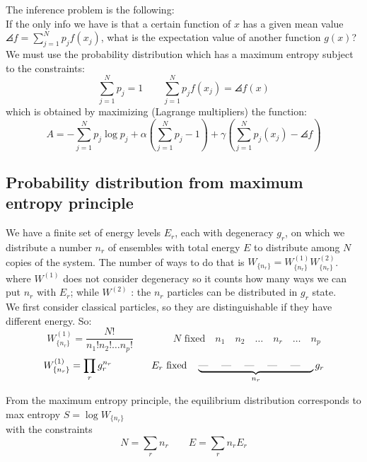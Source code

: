 The inference problem is the following:\\
If the only info we have is that a certain function of $x$ has a given mean value $\angles f = \sum_{j=1}^N p_j f(x_j)$, what is the expectation value of another function $g(x)$?
We must use the probability distribution which has a maximum entropy subject to the constraints:
$$ \sum_{j=1}^N p_j = 1 \qquad \sum_{j=1}^N p_jf(x_j) = \angles {f(x)}$$
which is obtained by maximizing (Lagrange multipliers) the function:
$$ A = -\sum_{j=1}^N p_j\log p_j + \alpha \left(\sum_{j=1}^N p_j - 1 \right) + \gamma \left(\sum_{j=1}^N p_j(x_j) - \angles f \right)$$


\subsection{Probability distribution from maximum entropy principle}
We have a finite set of energy levels $E_r$, each with degeneracy $g_r$, on which we distribute a number $n_r$ of ensembles with total energy $E$ to distribute among $N$ copies of the system.
The number of ways to do that is $W_{\{n_r\}} = W^{(1)}_{\{n_r\}} W^{(2)}_{\{n_r\}}$.\\
where $W^{(1)}$ does not consider degeneracy so it counts how many ways we can put $n_r$ with $E_r$; while $W^{(2)}$ : the $n_r$ particles can be distributed in $g_r$ state.\\

We first consider classical particles, so they are distinguishable if they have different energy. So:
$$ W^{(1)}_{\{n_r\}} = \frac{N!}{n_1!n_2!\dots n_p!} \qquad\qquad \text{$N$ fixed} \quad n_1 \quad n_2 \quad \dots \quad n_r \quad \dots \quad n_p $$
$$W^{(1)}_{\{n_r\}} = \prod_r g_r^{n_r} \qquad\qquad \text{$E_r$ fixed} \quad \underbrace{\text{--- \quad --- \quad --- \quad --- \quad --- \quad}}_{n_r} g_r$$

From the maximum entropy principle, the equilibrium distribution corresponds to max entropy $ S = \log W_{\{n_r\}}$\\
with the constraints 
$$ N = \sum_r n_r \qquad E = \sum_r n_r E_r$$

